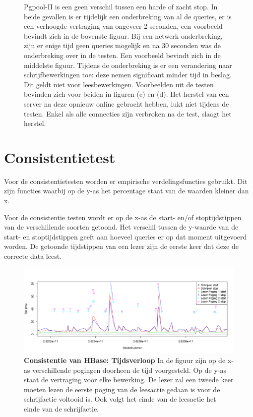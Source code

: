 \begin{figure}[ht!]
{	Pgpool-II is een geen verschil tussen een harde of zacht stop. In beide gevallen is er tijdelijk een onderbreking van al de queries, er is een verhoogde vertraging van ongeveer 2 seconden, een voorbeeld bevindt zich in de bovenste figuur. \newline
	Bij een netwerk onderbreking, zijn er enige tijd geen queries mogelijk en na 30 seconden was de onderbreking over in de testen. Een voorbeeld bevindt zich in de middelste figuur.  \newline
	Tijdens de onderbreking is er een verandering naar schrijfbewerkingen toe: deze nemen significant minder tijd in beslag. Dit geldt niet voor leesbewerkingen. Voorbeelden uit de testen bevinden zich voor beiden in figuren (c) en (d). \newline
	Het herstel van een server na deze opnieuw online gebracht hebben, lukt niet tijdens de testen. Enkel als alle connecties zijn verbroken na de test, slaagt het herstel.  }
	\label{fig:beschikbaar-pgpool}
\end{figure}

\FloatBarrier
\section{Consistentietest}
Voor de consistentietesten worden er empirische verdelingsfuncties gebruikt. Dit zijn functies waarbij op de y-as het percentage staat van de waarden kleiner dan x.

Voor de consistentie testen wordt er op de x-as de start- en/of stoptijdstippen van de verschillende soorten getoond. Het verschil tussen de y-waarde van de start- en stoptijdstippen geeft aan hoeveel queries er op dat moment uitgevoerd worden. De getoonde tijdstippen van een lezer zijn de eerste keer dat deze de correcte data leest. 

\begin{figure}[b] 
	\centering
	\includegraphics[width=\textwidth]{img/Observaties/HBase/consistency-plot-R-1-insertRawData-5}

	\caption{\textbf{Consistentie van HBase: Tijdsverloop} \newline
 	In de figuur zijn op de x-as verschillende pogingen doorheen de tijd voorgesteld. Op de y-as staat de vertraging voor elke bewerking. De lezer zal een tweede keer moeten lezen de eerste poging van de leesactie gedaan is voor de schrijfactie voltooid is. Ook volgt het einde van de leesactie het einde van de schrijfactie. }
	\label{fig:consistentie-hbase-tijdschaal-lezer-1}
\end{figure}

